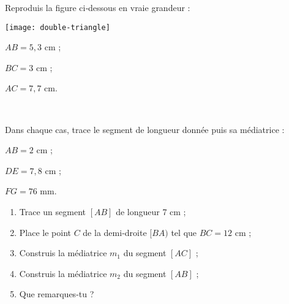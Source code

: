 \begin{exercice}
Reproduis la figure ci‑dessous en vraie grandeur : \\[0.75em]
\begin{minipage}[c]{0.3\textwidth}
\texttt{[image: double-triangle]}
 \end{minipage} \hfill%
 \begin{minipage}[c]{0.4\textwidth}
$AB = 5,3$ cm ;

$BC = 3$ cm ;

$AC = 7,7$ cm.
 \end{minipage} \\
\end{exercice}



\begin{exercice}[Médiatrices]
Dans chaque cas, trace le segment de longueur donnée puis sa médiatrice :
 \begin{colenumerate}{3}
  \item $AB = 2$ cm ;
  \item $DE = 7,8$ cm ;
  \item $FG = 76$ mm.
  \end{colenumerate}
\end{exercice}


\begin{exercice}
 \begin{enumerate}
  \item Trace un segment $[AB]$ de longueur 7 cm ;
  \item Place le point $C$ de la demi‑droite $[BA)$ tel que $BC = 12$ cm ;
  \item Construis la médiatrice $m_1$ du segment $[AC]$ ;
  \item Construis la médiatrice $m_2$ du segment $[AB]$ ;
  \item Que remarques‑tu ?
  \end{enumerate}
\end{exercice}


